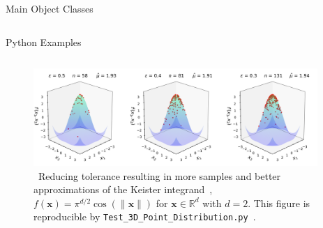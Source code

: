 \documentclass[final]{beamer}
\newlength{\onecolwid}
\newlength{\twocolwid}
\newlength{\threecolwid}
\newcommand{\bvec}[1]{\boldsymbol{#1}}
\newcommand{\vx}{\bvec{x}}
\begin{document}
\begin{frame}[t]
\begin{columns}[t]
\begin{column}{\threecolwid}
\begin{columns}[t,totalwidth=\threecolwid]
\begin{column}{\twocolwid}
\begin{block}{Main Object Classes}
\end{block}
\end{column}

\end{columns} 

\begin{column}{\threecolwid}\vspace{-.8in}
\begin{block}{Python Examples}

    \begin{column}{\onecolwid}
        
    \end{column}
    \begin{column}{\twocolwid}
    \vspace{-2ex}
        \begin{figure}
            \includegraphics[width=0.96\textwidth]{Images/Three_3d_SurfaceScatters.png}         
            \caption{\ Reducing tolerance resulting in more samples and better approximations of the Keister integrand~\cite{keister1996multidimensional}, $f(\vx) = \pi^{d/2} \cos(\lVert \vx \rVert)$ for $\vx \in  \mathbb{R}^d$ with $d=2$. This figure is reproducible by \texttt{Test\_3D\_Point\_Distribution.py~\cite{HicEtal19}}.}
        \end{figure} 
    \end{column}
    
\end{block}
\end{column}

\end{column}


\end{columns}
\end{frame}
\end{document}
